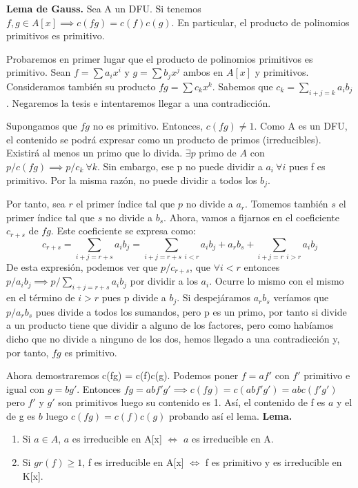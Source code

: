 \documentclass[11pt, a4paper, titlepage]{article}
\makeatletter
\renewenvironment{proof}[1][\proofname] {\vspace{-15pt}\par\pushQED{\qed}\normalfont\topsep6\p@\@plus6\p@\relax\trivlist\item[\hskip\labelsep\it#1\@addpunct{.}]\ignorespaces}{\popQED\endtrivlist\@endpefalse}
\theoremstyle{theorem-style}
\theoremstyle{definition-style}
\theoremstyle{remark-style}
\theoremstyle{example-style}
\newenvironment{nlist}
{\begin{enumerate}
\renewcommand\labelenumi{(\emph{\roman{enumi})}}}
{\end{enumerate}}
\makeatother
\begin{document}
\textbf{Lema de Gauss.} Sea A un DFU. Si tenemos $f,g \in A[x]\implies c(fg) = c(f)c(g)$. En particular, el producto de polinomios primitivos es primitivo.\\
\begin{proof}
	Probaremos en primer lugar que el producto de polinomios primitivos es primitivo. Sean $f= \sum a_i x^i $ y $g= \sum b_j x^j$ ambos en $A[x]$ y primitivos. Consideramos también su producto $fg = \sum c_k x^k$. Sabemos que  $c_k = \sum_{i+j=k}a_ib_j$. Negaremos la tesis e intentaremos llegar a una contradicción.
	
	Supongamos que $fg$ no es primitivo. Entonces, $c(fg) \ne 1$. Como A es un DFU, el contenido se podrá expresar como un producto de primos (irreducibles). Existirá al menos un primo que lo divida. $\exists p $ primo de $A$ con $p/c(fg) \implies p/c_k \ \forall k$. Sin embargo, ese p no puede dividir a $a_i \ \forall i$ pues f es primitivo. Por la misma razón, no puede dividir a todos los $b_j$. 
	
	Por tanto, sea $r$ el primer índice tal que $p$ no divide a $a_r$. Tomemos también $s$ el primer índice tal que $s$ no divide a $b_s$. Ahora, vamos a fijarnos en el coeficiente $c_{r+s}$ de $fg$. Este coeficiente se expresa como:
	 \[c_{r+s} = \sum _{i+j=r+s}a_ib_j = \sum _{i+j =r+s \ \ i < r}a_ib_j + a_rb_s + \sum_{i+j=r \ \ i > r}a_ib_j\]
	 De esta expresión, podemos ver que $p/c_{r+s}$, que $\forall i < r$ entonces $p/a_ib_j \implies p/\sum_{i+j =r+s}a_ib_j$ por dividir a los $a_i$. Ocurre lo mismo con el mismo en el término de $i > r $ pues p divide a $b_j$. Si despejáramos $a_rb_s$ veríamos que $p/a_rb_s$ pues divide a todos los sumandos, pero p es un primo, por tanto si divide a un producto tiene que dividir a alguno de los factores, pero como habíamos dicho que no divide a ninguno de los dos, hemos llegado a una contradicción y, por tanto, $fg$ es primitivo.
	 
	 Ahora demostraremos c(fg) = c(f)c(g). Podemos poner $f=af'$ con $f'$ primitivo e igual con $g=bg'$. Entonces $fg= abf'g'\implies c(fg)=c(abf'g') = abc(f'g')$ pero $f'$ y $g'$ son primitivos luego su contenido es 1. Así, el contenido de f es $a$ y el de g es $b$ luego $c(fg) = c(f)c(g)$ probando así el lema.
\end{proof}
\newpage
\textbf{Lema.} 
\begin{nlist}
	\item Si $a \in A$, $a$ es irreducible en A[x] $\Leftrightarrow$ $a$ es irreducible en A.
	\item Si $gr(f) \geq 1$, f es irreducible en A[x] $\Leftrightarrow$ f es primitivo y es irreducible en K[x]. 
 \end{nlist}
\end{document}
